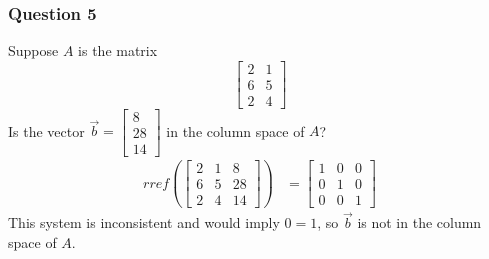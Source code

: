 \documentclass{math}
\begin{document}
\subsubsection*{Question 5}
Suppose \( A \) is the matrix
\[ \begin{bmatrix}
  2 & 1 \\
  6 & 5 \\
  2 & 4
\end{bmatrix} \]
Is the vector \( \vec{b} = \begin{bmatrix}8 \\ 28 \\ 14\end{bmatrix} \) in
the column space of \( A \)?
\begin{align*}
  rref\left(\begin{bmatrix}
    2 & 1 & 8 \\
    6 & 5 & 28 \\
    2 & 4 & 14
  \end{bmatrix}\right) &= \begin{bmatrix}
    1 & 0 & 0 \\
    0 & 1 & 0 \\
    0 & 0 & 1
  \end{bmatrix}
\end{align*}
This system is inconsistent and would imply \( 0 = 1 \), so \( \vec{b} \) is
not in the column space of \( A \).
\end{document}
